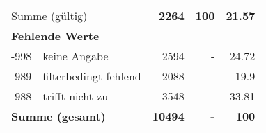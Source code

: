 \begin{longtable}{lXrrr}
     \midrule
     \multicolumn{2}{l}{Summe (gültig)} &
       \textbf{\num{2264}} &
     \textbf{100} &
       \textbf{\num[round-mode=places,round-precision=2]{21,57}} \\
     \multicolumn{5}{l}{\textbf{Fehlende Werte}}\\
       -998 &
       keine Angabe &
         \num{2594} &
        - &
         \num[round-mode=places,round-precision=2]{24,72} \\
       -989 &
       filterbedingt fehlend &
         \num{2088} &
        - &
         \num[round-mode=places,round-precision=2]{19,9} \\
       -988 &
       trifft nicht zu &
         \num{3548} &
        - &
         \num[round-mode=places,round-precision=2]{33,81} \\
     \midrule
     \multicolumn{2}{l}{\textbf{Summe (gesamt)}} &
          \textbf{\num{10494}} &
        \textbf{-} &
        \textbf{100} \\
     \bottomrule
     \end{longtable}
     
